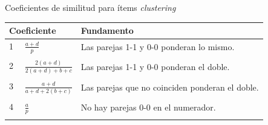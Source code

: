 \documentclass[spanish]{beamer}
\begin{document}
\begin{frame}{Coeficientes de similitud para ítems \textit{clustering}}

\begin{table}[H]
  \centering
\resizebox{11cm}{!} {
\begin{tabular}{ll}
\toprule               
\multicolumn{1}{l}{Coeficiente} & \multicolumn{1}{l}{Fundamento}\\
\midrule
1 $\quad\frac{a+d}{p}$                            & Las parejas 1-1 y 0-0 ponderan lo mismo.\\ \\
2 $\quad\frac{2(a+d)}{2(a+d)+b+c}$                            & Las parejas 1-1 y 0-0 ponderan el doble.                                                                                                        \\\\
3 $\quad\frac{a+d}{a+d+2(b+c)}$                             & Las parejas que no coinciden ponderan el doble.                                                                                                 \\\\
4  $\quad\frac{a}{p}$                             & No hay parejas 0-0 en el numerador.                                                                                                    \\         \\
\bottomrule
\end{tabular}
}
\end{table}

\end{frame}
\end{document}

